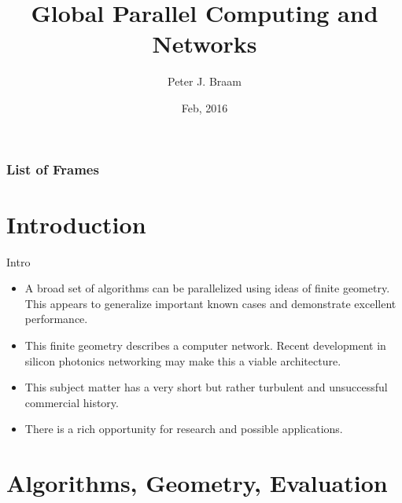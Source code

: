 \documentclass{beamer}
\author[Peter J. Braam]{Peter J. Braam}
\title[Global Parallel Computing \hspace{2em}\insertframenumber/\inserttotalframenumber]
{Global Parallel Computing and Networks}
\date{Feb, 2016} %
\institute{Parallel Scientific, LLC}
\makeatletter
\newcommand\listofframes{\@starttoc{lbf}}
\makeatother
\begin{document}
\begin{frame}
\frametitle{List of Frames}
\listofframes
\end{frame}




\maketitle

\tableofcontents 


\section{Introduction}

\begin{frame}{Intro}

\begin{itemize}
    \item A broad set of algorithms can be parallelized using ideas of finite geometry.  This appears to generalize important known cases and demonstrate excellent performance.
    \item This finite geometry describes a computer network. Recent development in silicon photonics networking may make this a viable architecture.
    \item This subject matter has a very short but rather turbulent and unsuccessful commercial history. 
    \item There is a rich opportunity for research and possible applications.
\end{itemize}  
\end{frame}

\section{Algorithms, Geometry, Evaluation}
\end{document}
